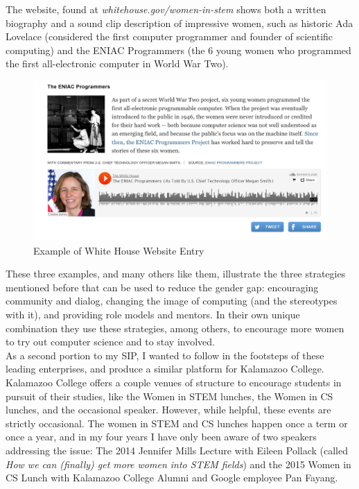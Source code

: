 \documentclass[12pt]{article}
\begin{document}
	The website, found at \textit{whitehouse.gov/women-in-stem} shows both a written biography and a sound clip description of impressive women, such as historic Ada Lovelace (considered the first computer programmer and founder of scientific computing) and the ENIAC Programmers (the 6 young women who programmed the first all-electronic computer in World War Two).\\
			
			\begin{figure}[H]
				\begin{center}
					\includegraphics[width=\textwidth,keepaspectratio]{WhiteHouseExample}
					\caption{Example of White House Website Entry}
				\end{center}
			\end{figure}
			
	
	These three examples, and many others like them, illustrate the three strategies mentioned before that can be used to reduce the gender gap: encouraging community and dialog, changing the image of computing (and the stereotypes with it), and providing role models and mentors. In their own unique combination  they use these strategies, among others, to encourage more women to try out computer science and to stay involved. \\
	
	As a second portion to my SIP, I wanted to follow in the footsteps of these leading enterprises, and produce a similar platform for Kalamazoo College. Kalamazoo College offers a couple venues of structure to encourage students in pursuit of their studies, like the Women in STEM lunches, the Women in CS lunches, and the occasional speaker. However, while helpful, these events are strictly occasional. The women in STEM and CS lunches happen once a term or once a year, and in my four years I have only been aware of two speakers addressing the issue:  The 2014 Jennifer Mills Lecture with Eileen Pollack (called \textit{How we can (finally) get more women into STEM fields}) and the 2015 Women in CS Lunch with Kalamazoo College Alumni and Google employee Pan Fayang.\\
	
\end{document}
